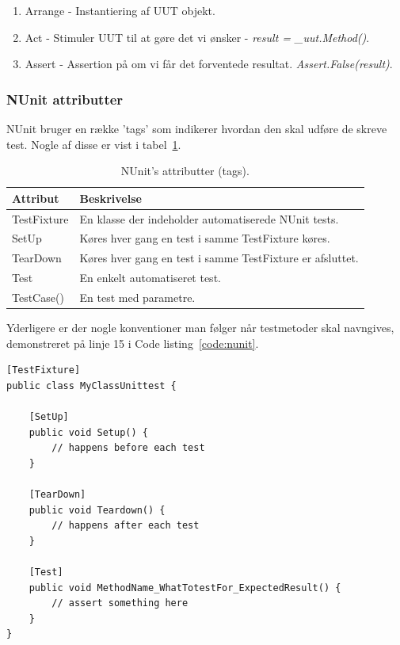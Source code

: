 \begin{enumerate}
	\item Arrange - Instantiering af UUT objekt.
	\item Act - Stimuler UUT til at gøre det vi ønsker - \textit{result = \_uut.Method()}.
	\item Assert - Assertion på om vi får det forventede resultat. \textit{Assert.False(result)}.
\end{enumerate}

\subsubsection{NUnit attributter}
NUnit bruger en række 'tags' som indikerer hvordan den skal udføre de skreve test. Nogle af disse er vist i tabel~\ref{tab:nunit}.

\begin{table}[H]
	\centering
	\begin{tabular}{ll}
		\toprule
		\rowcolor{Black!5} \textbf{Attribut}& 	\textbf{Beskrivelse}\\ \midrule
		TestFixture	&	En klasse der indeholder automatiserede NUnit tests. \\
		SetUp		&	Køres hver gang en test i samme TestFixture køres.\\
		TearDown	&	Køres hver gang en test i samme TestFixture er afsluttet.\\
		Test		&	En enkelt automatiseret test.\\
		TestCase()	&	En test med parametre.\\ \bottomrule
	\end{tabular}
	\caption{NUnit's attributter (tags).}
	\label{tab:nunit}
\end{table}

Yderligere er der nogle konventioner man følger når testmetoder skal navngives, demonstreret på linje 15 i Code listing~\ref{code:nunit}.

\begin{lstlisting}[caption=NUnit eksempel på Setup og Teardown.,label=code:nunit]
[TestFixture]
public class MyClassUnittest {

	[SetUp]
	public void Setup() {
		// happens before each test
	}
	
	[TearDown]
	public void Teardown() {
		// happens after each test
	}
	
	[Test]
	public void MethodName_WhatTotestFor_ExpectedResult() {
		// assert something here
	}
}
\end{lstlisting}

